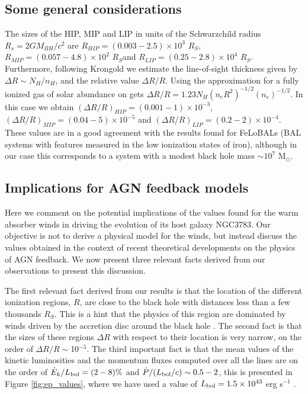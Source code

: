\documentclass{report}
\begin{document}
\subsection*{Some general considerations}
The sizes of the HIP, MIP and LIP in units of the Schwarzchild radius
$R_s=2GM_{BH}/c^2$ are $R_{HIP}= (0.003-2.5)\times 10^3$ $R_S$,
$R_{MIP} = (0.057-4.8)\times 10^2$ $R_S$and $R_{LIP}=(0.25 -
2.8)\times 10^4$ $R_S$. Furthermore, following Krongold we estimate
the line-of-sight thickness given by $\Delta R\sim N_{H}/n_H$, and the
relative value $\Delta R/R$. Using the approximation for a fully
ionized gas of solar abundance on gets $\Delta R/R=1.23N_H (n_e
R^2)^{-1/2} (n_e)^{-1/2}$. In this case we obtain $(\Delta R/
R)_{HIP}=(0.001-1)\times 10^{-3}$, $(\Delta R/ R)_{MIP}=(0.04-5)\times
10^{-5}$ and $(\Delta R/ R)_{LIP}=(0.2-2)\times 10^{-4}$. These values
are in a good agreement with the results found for FeLoBALs (BAL
systems with features measured in the low ionization states of iron),
although in our case this corresponds to a system with a modest black
hole mass $\sim 10^7$ M$_{\odot}$. 

\subsection*{Implications for AGN feedback models}
Here we comment on the potential implications of the values found for
the warm absorber winds in driving the evolution of its host galaxy
NGC3783. Our objective is not to derive a physical model for the
winds, but instead discuss the values obtained in the context of
recent theoretical developments on the physics of AGN feedback. We
now present three relevant facts derived from our observations to
present this discussion.


The first relevant fact derived from our results is that the location of the
different ionization regions, $R$, are close to the black hole with
distances less than a few thousands $R_S$. This is a hint that the
physics of this region are dominated by winds driven by the accretion
disc around the black hole \cite{Murray1995}. The second fact is that
the sizes of these regions $\Delta R$ with respect to their location
is very narrow, on the order of $\Delta R/R\sim $10$^{-5}$. The third
important fact is that the mean values of the kinetic luminosities and the
momentum fluxes computed over all the lines are on the order of
$\dot{E}_k/L_{\rm bol}= (2-8)\%$ and $\dot{P}/(L_{\rm bol}/c)\sim 0.5
-2 $, this is presented in Figure \ref{fig:ep_values}, where we have
used a value of $L_{\rm bol}=1.5\times 10^{43}$ erg s$^{-1}$
\cite{Netzer2003}. 
                              
\end{document}
